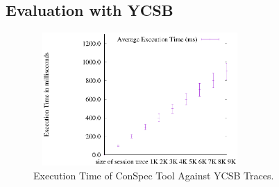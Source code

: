 \documentclass[conference]{IEEEtran}
\begin{document}
	\subsection{Evaluation with YCSB}\label{sec:evalycsb}
	\begin{figure}%
		\includegraphics[width=3.2in,height=2in]
		{conspecYCSBvarhist.eps} %
		\caption{Execution Time of ConSpec Tool Against YCSB Traces.}
		\label{fig:examplefull}
	\end{figure}
	
\end{document}
